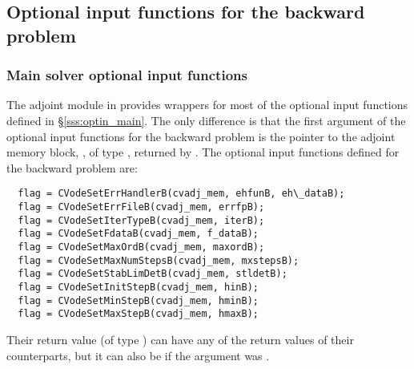\subsection{Optional input functions for the backward problem}
\label{ss:optional_input_B}
\subsubsection{Main solver optional input functions}

The adjoint module in {\cvodes} provides wrappers for most of the optional 
input functions defined in \S\ref{sss:optin_main}. The only difference is 
that the first argument of the optional input functions for the backward problem
is the pointer to the adjoint memory block, , of type ,
returned by . 
The optional input functions defined for the backward problem are:
\begin{verbatim}
  flag = CVodeSetErrHandlerB(cvadj_mem, ehfunB, eh\_dataB);
  flag = CVodeSetErrFileB(cvadj_mem, errfpB);
  flag = CVodeSetIterTypeB(cvadj_mem, iterB);
  flag = CVodeSetFdataB(cvadj_mem, f_dataB);
  flag = CVodeSetMaxOrdB(cvadj_mem, maxordB);
  flag = CVodeSetMaxNumStepsB(cvadj_mem, mxstepsB);
  flag = CVodeSetStabLimDetB(cvadj_mem, stldetB);
  flag = CVodeSetInitStepB(cvadj_mem, hinB);
  flag = CVodeSetMinStepB(cvadj_mem, hminB);
  flag = CVodeSetMaxStepB(cvadj_mem, hmaxB);
\end{verbatim}
Their return value  (of type ) can have any of the return values 
of their counterparts, but it can also be  if the  
argument was .

